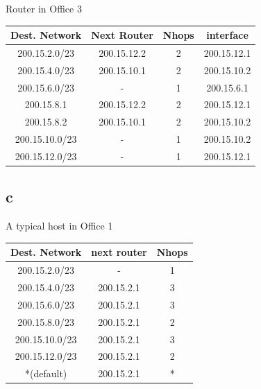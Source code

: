 \documentclass[a4paper, 11pt]{article}
\begin{document}
\begin{center}
	Router in Office 3
	\vspace{4mm}
	
	\begin{tabular}{|c|c|c|c|}
		\hline
		Dest. Network & Next Router & Nhops & interface \\ \hline
		200.15.2.0/23 & 200.15.12.2 & 2 & 200.15.12.1 \\ \hline
		200.15.4.0/23 & 200.15.10.1 & 2 & 200.15.10.2 \\ \hline
		200.15.6.0/23 & -			 & 1 & 200.15.6.1 \\ \hline
		200.15.8.1		& 200.15.12.2 & 2 & 200.15.12.1 \\ \hline
		200.15.8.2		& 200.15.10.1 & 2 & 200.15.10.2 \\ \hline
		200.15.10.0/23 & - & 1 & 200.15.10.2 \\ \hline
		200.15.12.0/23 & - & 1 & 200.15.12.1 \\ \hline
	\end{tabular}
\end{center}

\subsection{c}
\begin{center}
	A typical host in Office 1
	\vspace{4mm}
	
	\begin{tabular}{|c|c|c|}
		\hline
		Dest. Network	&	next router		&	Nhops	\\ \hline
		200.15.2.0/23	&	-	&	1	\\ \hline
		200.15.4.0/23	&	200.15.2.1	&	3	\\ \hline
		200.15.6.0/23	&	200.15.2.1	&	3	\\ \hline
		200.15.8.0/23	&	200.15.2.1	&	2	\\ \hline
		200.15.10.0/23	&	200.15.2.1	&	3	\\ \hline
		200.15.12.0/23	&	200.15.2.1	&	2	\\ \hline
		*(default)	&	200.15.2.1	&	*	\\ \hline
	\end{tabular}
\end{center}
\end{document}

